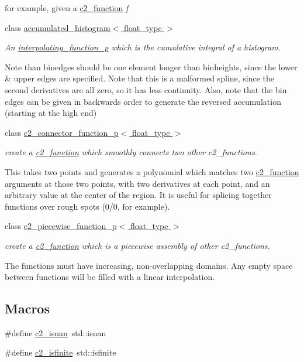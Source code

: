 \begin{DoxyCompactItemize}
\begin{DoxyCompactList}
for example, given a \hyperlink{classc2__function}{c2\+\_\+function} {\itshape f} \end{DoxyCompactList}\item 
class \hyperlink{classaccumulated__histogram}{accumulated\+\_\+histogram$<$ float\+\_\+type $>$}
\begin{DoxyCompactList}\small\item\em An \hyperlink{classinterpolating__function__p}{interpolating\+\_\+function\+\_\+p} which is the cumulative integral of a histogram.

Note than binedges should be one element longer than binheights, since the lower \& upper edges are specified. Note that this is a malformed spline, since the second derivatives are all zero, so it has less continuity. Also, note that the bin edges can be given in backwards order to generate the reversed accumulation (starting at the high end) \end{DoxyCompactList}\item 
class \hyperlink{classc2__connector__function__p}{c2\+\_\+connector\+\_\+function\+\_\+p$<$ float\+\_\+type $>$}
\begin{DoxyCompactList}\small\item\em create a \hyperlink{classc2__function}{c2\+\_\+function} which smoothly connects two other c2\+\_\+functions.

This takes two points and generates a polynomial which matches two \hyperlink{classc2__function}{c2\+\_\+function} arguments at those two points, with two derivatives at each point, and an arbitrary value at the center of the region. It is useful for splicing together functions over rough spots (0/0, for example). \end{DoxyCompactList}\item 
class \hyperlink{classc2__piecewise__function__p}{c2\+\_\+piecewise\+\_\+function\+\_\+p$<$ float\+\_\+type $>$}
\begin{DoxyCompactList}\small\item\em create a \hyperlink{classc2__function}{c2\+\_\+function} which is a piecewise assembly of other c2\+\_\+functions.

The functions must have increasing, non-\/overlapping domains. Any empty space between functions will be filled with a linear interpolation. \end{DoxyCompactList}\end{DoxyCompactItemize}
\subsection*{Macros}
\begin{DoxyCompactItemize}
\item 
\#define \hyperlink{c2__function_8hh_a14afbcf351b849f9d6c93270e1209145}{c2\+\_\+isnan}~std\+::isnan
\item 
\#define \hyperlink{c2__function_8hh_a87bfb19e93b8b5a8d6f4467823e49358}{c2\+\_\+isfinite}~std\+::isfinite
\end{DoxyCompactItemize}


